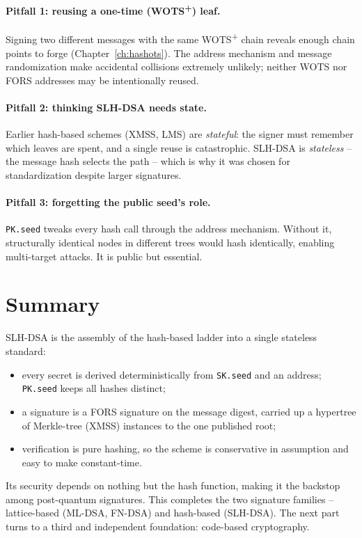 \paragraph{Pitfall 1: reusing a one-time (WOTS\textsuperscript{+}) leaf.}
Signing two different messages with the same WOTS\textsuperscript{+} chain reveals enough chain points to forge (Chapter~\ref{ch:hashots}). The address mechanism and message randomization make accidental collisions extremely unlikely; neither WOTS nor FORS addresses may be intentionally reused.

\paragraph{Pitfall 2: thinking SLH-DSA needs state.}
Earlier hash-based schemes (XMSS, LMS) are \emph{stateful}: the signer must remember which leaves are spent, and a single reuse is catastrophic. SLH-DSA is \emph{stateless} -- the message hash selects the path -- which is why it was chosen for standardization despite larger signatures.

\paragraph{Pitfall 3: forgetting the public seed's role.}
\texttt{PK.seed} tweaks every hash call through the address mechanism. Without it, structurally identical nodes in different trees would hash identically, enabling multi-target attacks. It is public but essential.

\section{Summary}
SLH-DSA is the assembly of the hash-based ladder into a single stateless standard:

\begin{itemize}
  \item every secret is derived deterministically from \texttt{SK.seed} and an address; \texttt{PK.seed} keeps all hashes distinct;
  \item a signature is a FORS signature on the message digest, carried up a hypertree of Merkle-tree (XMSS) instances to the one published root;
  \item verification is pure hashing, so the scheme is conservative in assumption and easy to make constant-time.
\end{itemize}

Its security depends on nothing but the hash function, making it the backstop among post-quantum signatures. This completes the two signature families -- lattice-based (ML-DSA, FN-DSA) and hash-based (SLH-DSA). The next part turns to a third and independent foundation: code-based cryptography.

\printbibliography[heading=chapterrefs]
